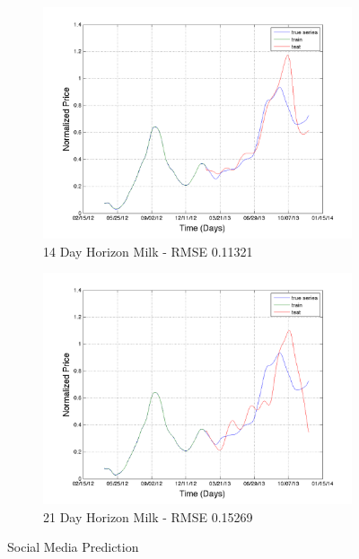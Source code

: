 \begin{figure}
        \begin{subfigure}[b]{0.5\textwidth}
                \includegraphics[width=\textwidth]{img/model/milk/model3_3/pred_14}
                \caption{14 Day Horizon Milk - RMSE 0.11321  }
                \label{fig:tiger}
        \end{subfigure}%
              \begin{subfigure}[b]{0.5\textwidth}
                \includegraphics[width=\textwidth]{img/model/milk/model3_3/pred_21}
                \caption{21 Day Horizon Milk  - RMSE 0.15269 }
                \label{fig:tiger}
        \end{subfigure}%
        \caption{Social Media Prediction}\label{fig:comp_exp}
\end{figure}













